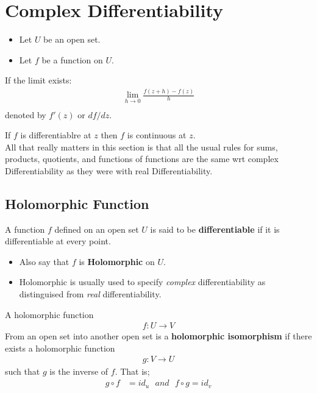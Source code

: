 \section{Complex Differentiability}
\begin{itemize}
	\item Let $U$ be an open set. 
	\item Let $f$ be a function on $U.$
\end{itemize}

\begin{defn}
	If the limit exists:
	\begin{align*}
		\lim_{h \to 0} \frac{f(z + h) - f(z)}{h} \\
	\end{align*}
	denoted by $f'(z)$ or $df/dz.$ \\
\end{defn}
If $f$ is differentiablre at $z$ then $f$ is continuous at $z.$ \\

All that really matters in this section 
is that all the usual rules for sums, products, quotients, and functions of functions are the same 
wrt complex Differentiability as they were with real Differentiability.

\subsection{Holomorphic Function}
A function $f$ defined on an open set $U$ is said to be \textbf{differentiable} if it is differentiable at every point.
\begin{itemize}
	\item Also say that $f$ is \textbf{Holomorphic} on $U.$
	\item Holomorphic is usually used to specify \textit{complex} differentiability as distinguised from \textit{real} differentiability.
\end{itemize}

\begin{defn}
	A holomorphic function
	\begin{align*}
		f: U \to V
	\end{align*}
	From an open set into another open set is a \textbf{holomorphic isomorphism} if there exists a holomorphic function
	\begin{align*}
		g: V \to U
	\end{align*}
	such that $g$ is the inverse of $f.$ That is;
	\begin{align*}
		g \circ f &= id_u \,\,\,\,
		and \,\,\,\,
		f \circ g = id_v
	\end{align*}
\end{defn}

